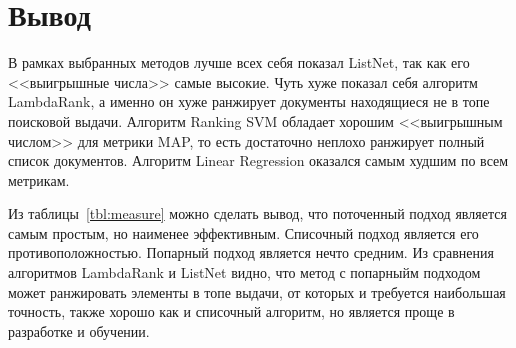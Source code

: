 \section{Вывод}

В рамках выбранных методов лучше всех себя показал ListNet, так как его <<выигрышные числа>> самые высокие. Чуть хуже показал себя алгоритм LambdaRank, а именно он хуже ранжирует документы находящиеся не в топе поисковой выдачи. Алгоритм Ranking SVM обладает хорошим <<выигрышным числом>> для метрики MAP, то есть достаточно неплохо ранжирует полный список документов. Алгоритм Linear Regression оказался самым худшим по всем метрикам.

Из таблицы~\ref{tbl:measure} можно сделать вывод, что поточенный подход является самым простым, но наименее эффективным. Списочный подход является его противоположностью. Попарный подход является нечто средним. Из сравнения алгоритмов LambdaRank и ListNet видно, что метод с попарныйм подходом может ранжировать элементы в топе выдачи, от которых и требуется наибольшая точность, также хорошо как и списочный алгоритм, но является проще в разработке и обучении.